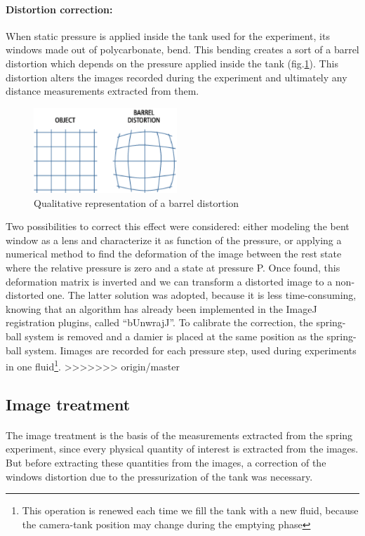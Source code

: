 \paragraph{Distortion correction:}
When static pressure is applied inside the tank used for the experiment, its windows made out of polycarbonate, bend. This bending creates a sort of a barrel distortion which depends on the pressure applied inside the tank (fig.\ref{fig:barrel_distortion}). This distortion alters the images recorded during the experiment and ultimately any distance measurements extracted from them.
\begin{figure}[H] %
	\centering%
  \includegraphics[width=0.48\textwidth]{figures/Chapter_1/barrel_effect.png}
	\caption{Qualitative representation of a barrel distortion}
	\label{fig:barrel_distortion}
\end{figure}
 Two possibilities to correct this effect were considered: either modeling the bent window as a lens and characterize it as function of the pressure, or applying a numerical method to find the deformation of the image between the rest state where the relative pressure is zero and a state at pressure P. Once found, this deformation matrix is inverted and we can transform a distorted image to a non-distorted one. The latter solution was adopted, because it is less time-consuming, knowing that an algorithm has already been implemented in the ImageJ registration plugins, called "`bUnwrajJ"'.
To calibrate the correction, the spring-ball system is removed and a damier is placed at the same position as the spring-ball system. Iimages are recorded for each pressure step, used during experiments in one fluid\footnote{This operation is renewed each time we fill the tank with a new fluid, because the camera-tank position may change during the emptying phase}.
>>>>>>> origin/master




\subsection{Image treatment}
\paragraph{}
 The image treatment is the basis of the measurements extracted from the spring experiment, since every physical quantity of interest is extracted from the images. But before extracting these quantities from the images, a correction of the windows distortion due to the pressurization of the tank was necessary.
